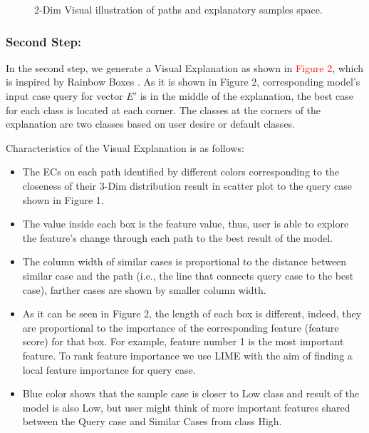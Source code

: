 \documentclass{llncs}
\begin{document}
\begin{figure}
	\centering
	
    \qquad
    
	\caption{2-Dim Visual illustration of paths and explanatory samples space.}
\end{figure}

\subsubsection*{Second Step:} In the second step, we generate a Visual Explanation as shown in \textcolor{red}{Figure 2}, which is inspired by Rainbow Boxes \cite{lamy2017rainbow}. As it is shown in Figure 2, corresponding model's input case query for vector $E'$ is in the middle of the explanation, the best case for each class is located at each corner. The classes at the corners of the explanation are two classes based on user desire or default classes.

Characteristics of the Visual Explanation is as follows: 
\begin{itemize}
	\item The ECs on each path identified by different colors corresponding to the closeness of their 3-Dim distribution result in scatter plot to the query case shown in Figure 1.
	\item The value inside each box is the feature value, thus, user is able to explore the feature's change through each path to the best result of the model.
	\item The column width of similar cases is proportional to the distance between similar case and the path (i.e., the line that connects query case to the best case), farther cases are shown by smaller column width.
	\item As it can be seen in Figure 2, the length of each box is different, indeed, they are proportional to the importance of the corresponding feature (feature score) for that box. For example, feature number 1 is the most important feature. To rank feature importance we use LIME with the aim of finding a local feature importance for query case. 
	\item Blue color shows that the sample case is closer to Low class and result of the model is also Low, but user might think of more important features shared between the Query case and Similar Cases from class High. 
\end{itemize}
 
\end{document}
